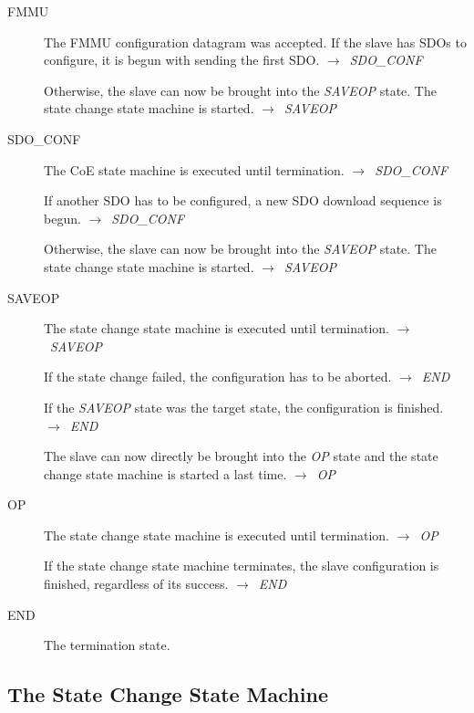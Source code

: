 \documentclass[a4paper,12pt,BCOR6mm,bibtotoc,idxtotoc]{scrbook}
\begin{document}
\begin{description}
\item[FMMU] The FMMU configuration datagram was accepted. If the slave
  has SDOs to configure, it is begun with sending the first SDO.
  $\rightarrow$~\textit{SDO\_CONF}

  Otherwise, the slave can now be brought into the \textit{SAVEOP}
  state. The state change state machine is started.
  $\rightarrow$~\textit{SAVEOP}

\item[SDO\_CONF] The CoE state machine is executed until termination.
  $\rightarrow$~\textit{SDO\_CONF}

  If another SDO has to be configured, a new SDO download sequence is
  begun. $\rightarrow$~\textit{SDO\_CONF}

  Otherwise, the slave can now be brought into the \textit{SAVEOP}
  state. The state change state machine is started.
  $\rightarrow$~\textit{SAVEOP}

\item[SAVEOP] The state change state machine is executed until
  termination. $\rightarrow$~\textit{SAVEOP}

  If the state change failed, the configuration has to be aborted.
  $\rightarrow$~\textit{END}

  If the \textit{SAVEOP} state was the target state, the configuration
  is finished. $\rightarrow$~\textit{END}

  The slave can now directly be brought into the \textit{OP} state and
  the state change state machine is started a last time.
  $\rightarrow$~\textit{OP}

\item[OP] The state change state machine is executed until
  termination. $\rightarrow$~\textit{OP}

  If the state change state machine terminates, the slave
  configuration is finished, regardless of its success.
  $\rightarrow$~\textit{END}

\item[END] The termination state.

\end{description}


\subsection{The State Change State Machine}
\label{sec:fsm-change}
\end{document}
